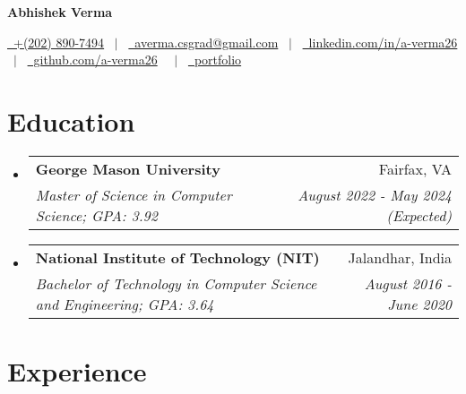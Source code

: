 \documentclass[letterpaper,10.8pt]{article}
\makeatletter
\newcommand{\resumeSubheading}[4]{
  \vspace{-1pt}\item
    \begin{tabular*}{0.97\textwidth}{l@{\extracolsep{\fill}}r}
      \textbf{#1} & #2 \\
      \textit{\small#3} & \textit{\small #4} \\
    \end{tabular*}\vspace{-5pt}
}
\newcommand{\resumeSubHeadingListStart}{\begin{itemize}[leftmargin=*]}
\newcommand{\resumeSubHeadingListEnd}{\end{itemize}}
\makeatother
\begin{document}



\begin{center}
\textbf{\fontsize{16}{28}\selectfont Abhishek Verma}
\end{center}

\begin{center}

\href{tel:+2028907494} 
{\raisebox{-0.05\height}\faPhone\ +(202) 890-7494} \ $|$ \
\href{mailto:averma.csgrad@gmail.com}
{\raisebox{-0.05\height}\faEnvelope \ averma.csgrad@gmail.com} \
$|$ \
\href{https://www.linkedin.com/in/a-verma26/}{\raisebox{-0.05\height}\faLinkedin\ linkedin.com/in/a-verma26} \ $|$ \
\href{https://github.com/a-verma26}{\raisebox{-0.05\height}\faGithub\ github.com/a-verma26} \ 
\ $|$ \
\href{https://abhishek-portfolio-fnr3uhm4x-a-verma26s-projects.vercel.app/}{\raisebox{-0.05\height}\faUser\ portfolio} \ 
\end{center}



\section{Education}

  \resumeSubHeadingListStart

    \resumeSubheading
      {George Mason University}{Fairfax, VA}
      {Master of Science in Computer Science;  GPA: 3.92}{August 2022 - May 2024 (Expected)}
       


	    \vspace{2pt}
    \resumeSubheading
      {National Institute of Technology (NIT)}{Jalandhar, India}
      {Bachelor of Technology in Computer Science and Engineering;   GPA: 3.64 }{August 2016 - June 2020}

      
  \resumeSubHeadingListEnd



\section{Experience}
\end{document}
